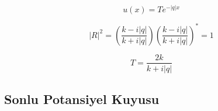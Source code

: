 \documentclass[a4paper,12pt, twoside]{article}
\begin{document}
\begin{equation}
u ( x ) = T e ^ { - | q | x }
\end{equation}


\begin{equation}
| R | ^ { 2 } = \left( \frac { k - i | q | } { k + i | q | } \right) \left( \frac { k - i | q | } { k + i | q | } \right) ^ { * } = 1
\end{equation}


\begin{equation}
T = \frac { 2 k } { k + i | q | }
\end{equation}


\subsection{Sonlu Potansiyel Kuyusu}

\newpage
\renewcommand\refname{Kaynaklar}
{}
 
\end{document}
